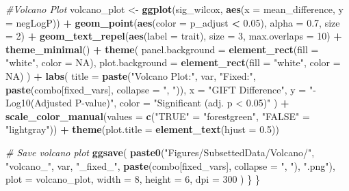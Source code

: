 \documentclass[
]{book}
\newenvironment{Shaded}{\begin{snugshade}}{\end{snugshade}}
\newcommand{\AttributeTok}[1]{\textcolor[rgb]{0.13,0.29,0.53}{#1}}
\newcommand{\CommentTok}[1]{\textcolor[rgb]{0.56,0.35,0.01}{\textit{#1}}}
\newcommand{\ConstantTok}[1]{\textcolor[rgb]{0.56,0.35,0.01}{#1}}
\newcommand{\DecValTok}[1]{\textcolor[rgb]{0.00,0.00,0.81}{#1}}
\newcommand{\FloatTok}[1]{\textcolor[rgb]{0.00,0.00,0.81}{#1}}
\newcommand{\FunctionTok}[1]{\textcolor[rgb]{0.13,0.29,0.53}{\textbf{#1}}}
\newcommand{\NormalTok}[1]{#1}
\newcommand{\OtherTok}[1]{\textcolor[rgb]{0.56,0.35,0.01}{#1}}
\newcommand{\SpecialCharTok}[1]{\textcolor[rgb]{0.81,0.36,0.00}{\textbf{#1}}}
\newcommand{\StringTok}[1]{\textcolor[rgb]{0.31,0.60,0.02}{#1}}
\begin{document}
\begin{Shaded}
\begin{Highlighting}[]
    \CommentTok{\#Volcano Plot}
\NormalTok{    volcano\_plot }\OtherTok{\textless{}{-}} \FunctionTok{ggplot}\NormalTok{(sig\_wilcox, }\FunctionTok{aes}\NormalTok{(}\AttributeTok{x =}\NormalTok{ mean\_difference, }\AttributeTok{y =}\NormalTok{ negLogP)) }\SpecialCharTok{+}
    \FunctionTok{geom\_point}\NormalTok{(}\FunctionTok{aes}\NormalTok{(}\AttributeTok{color =}\NormalTok{ p\_adjust }\SpecialCharTok{\textless{}} \FloatTok{0.05}\NormalTok{), }\AttributeTok{alpha =} \FloatTok{0.7}\NormalTok{, }\AttributeTok{size =} \DecValTok{2}\NormalTok{) }\SpecialCharTok{+}
    \FunctionTok{geom\_text\_repel}\NormalTok{(}\FunctionTok{aes}\NormalTok{(}\AttributeTok{label =}\NormalTok{ trait), }\AttributeTok{size =} \DecValTok{3}\NormalTok{, }\AttributeTok{max.overlaps =} \DecValTok{10}\NormalTok{) }\SpecialCharTok{+}
    \FunctionTok{theme\_minimal}\NormalTok{() }\SpecialCharTok{+}
    \FunctionTok{theme}\NormalTok{(}
      \AttributeTok{panel.background =} \FunctionTok{element\_rect}\NormalTok{(}\AttributeTok{fill =} \StringTok{"white"}\NormalTok{, }\AttributeTok{color =} \ConstantTok{NA}\NormalTok{),}
      \AttributeTok{plot.background =} \FunctionTok{element\_rect}\NormalTok{(}\AttributeTok{fill =} \StringTok{"white"}\NormalTok{, }\AttributeTok{color =} \ConstantTok{NA}\NormalTok{)}
\NormalTok{    ) }\SpecialCharTok{+}
    \FunctionTok{labs}\NormalTok{(}
      \AttributeTok{title =} \FunctionTok{paste}\NormalTok{(}\StringTok{"Volcano Plot:"}\NormalTok{, var, }\StringTok{"Fixed:"}\NormalTok{, }\FunctionTok{paste}\NormalTok{(combo[fixed\_vars], }\AttributeTok{collapse =} \StringTok{", "}\NormalTok{)),}
      \AttributeTok{x =} \StringTok{"GIFT Difference"}\NormalTok{,}
      \AttributeTok{y =} \StringTok{"{-}Log10(Adjusted P{-}value)"}\NormalTok{,}
      \AttributeTok{color =} \StringTok{"Significant (adj. p \textless{} 0.05)"}
\NormalTok{    ) }\SpecialCharTok{+}
    \FunctionTok{scale\_color\_manual}\NormalTok{(}\AttributeTok{values =} \FunctionTok{c}\NormalTok{(}\StringTok{"TRUE"} \OtherTok{=} \StringTok{"forestgreen"}\NormalTok{, }\StringTok{"FALSE"} \OtherTok{=} \StringTok{"lightgray"}\NormalTok{)) }\SpecialCharTok{+}
    \FunctionTok{theme}\NormalTok{(}\AttributeTok{plot.title =} \FunctionTok{element\_text}\NormalTok{(}\AttributeTok{hjust =} \FloatTok{0.5}\NormalTok{))}
  
    \CommentTok{\# Save volcano plot}
    \FunctionTok{ggsave}\NormalTok{(}
      \FunctionTok{paste0}\NormalTok{(}\StringTok{"Figures/SubsettedData/Volcano/"}\NormalTok{, }\StringTok{"volcano\_"}\NormalTok{, var, }\StringTok{"\_fixed\_"}\NormalTok{, }\FunctionTok{paste}\NormalTok{(combo[fixed\_vars], }\AttributeTok{collapse =} \StringTok{", "}\NormalTok{), }\StringTok{".png"}\NormalTok{),}
      \AttributeTok{plot =}\NormalTok{ volcano\_plot, }\AttributeTok{width =} \DecValTok{8}\NormalTok{, }\AttributeTok{height =} \DecValTok{6}\NormalTok{, }\AttributeTok{dpi =} \DecValTok{300}
\NormalTok{)}
\NormalTok{  \}}
\NormalTok{\}}


\end{Highlighting}
\end{Shaded}
\end{document}
